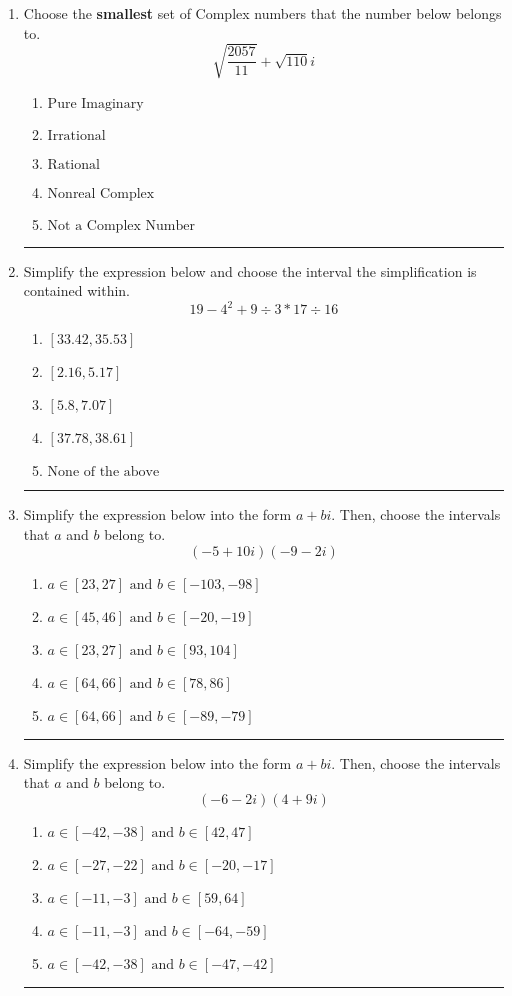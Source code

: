 \documentclass[14pt]{extbook}
\newcommand{\litem}[1]{\item#1\hspace*{-1cm}\rule{\textwidth}{0.4pt}}
\begin{document}
\begin{enumerate}
{\begin{enumerate}[label=\Alph*.]
\end{enumerate} }
\litem{
Choose the \textbf{smallest} set of Complex numbers that the number below belongs to.\[ \sqrt{\frac{2057}{11}}+\sqrt{110} i \]\begin{enumerate}[label=\Alph*.]
\item \( \text{Pure Imaginary} \)
\item \( \text{Irrational} \)
\item \( \text{Rational} \)
\item \( \text{Nonreal Complex} \)
\item \( \text{Not a Complex Number} \)

\end{enumerate} }
\litem{
Simplify the expression below and choose the interval the simplification is contained within.\[ 19 - 4^2 + 9 \div 3 * 17 \div 16 \]\begin{enumerate}[label=\Alph*.]
\item \( [33.42, 35.53] \)
\item \( [2.16, 5.17] \)
\item \( [5.8, 7.07] \)
\item \( [37.78, 38.61] \)
\item \( \text{None of the above} \)

\end{enumerate} }
\litem{
Simplify the expression below into the form $a+bi$. Then, choose the intervals that $a$ and $b$ belong to.\[ (-5 + 10 i)(-9 - 2 i) \]\begin{enumerate}[label=\Alph*.]
\item \( a \in [23, 27] \text{ and } b \in [-103, -98] \)
\item \( a \in [45, 46] \text{ and } b \in [-20, -19] \)
\item \( a \in [23, 27] \text{ and } b \in [93, 104] \)
\item \( a \in [64, 66] \text{ and } b \in [78, 86] \)
\item \( a \in [64, 66] \text{ and } b \in [-89, -79] \)

\end{enumerate} }
\litem{
Simplify the expression below into the form $a+bi$. Then, choose the intervals that $a$ and $b$ belong to.\[ (-6 - 2 i)(4 + 9 i) \]\begin{enumerate}[label=\Alph*.]
\item \( a \in [-42, -38] \text{ and } b \in [42, 47] \)
\item \( a \in [-27, -22] \text{ and } b \in [-20, -17] \)
\item \( a \in [-11, -3] \text{ and } b \in [59, 64] \)
\item \( a \in [-11, -3] \text{ and } b \in [-64, -59] \)
\item \( a \in [-42, -38] \text{ and } b \in [-47, -42] \)


\end{enumerate}}
\end{enumerate}
\end{document}
